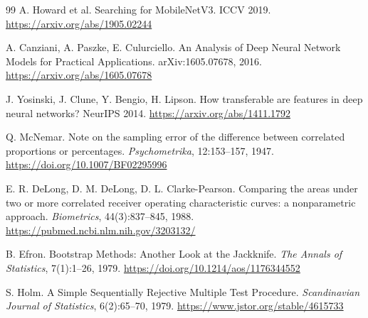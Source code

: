 \documentclass[11pt,a4paper]{article}
\begin{document}
\begin{thebibliography}{99}
A. Howard et al.
\newblock Searching for MobileNetV3.
\newblock ICCV 2019.
\newblock \url{https://arxiv.org/abs/1905.02244}

A. Canziani, A. Paszke, E. Culurciello.
\newblock An Analysis of Deep Neural Network Models for Practical Applications.
\newblock arXiv:1605.07678, 2016.
\newblock \url{https://arxiv.org/abs/1605.07678}

J. Yosinski, J. Clune, Y. Bengio, H. Lipson.
\newblock How transferable are features in deep neural networks?
\newblock NeurIPS 2014.
\newblock \url{https://arxiv.org/abs/1411.1792}

Q. McNemar.
\newblock Note on the sampling error of the difference between correlated proportions or percentages.
\newblock \textit{Psychometrika}, 12:153--157, 1947.
\newblock \url{https://doi.org/10.1007/BF02295996}

E. R. DeLong, D. M. DeLong, D. L. Clarke-Pearson.
\newblock Comparing the areas under two or more correlated receiver operating characteristic curves: a nonparametric approach.
\newblock \textit{Biometrics}, 44(3):837--845, 1988.
\newblock \url{https://pubmed.ncbi.nlm.nih.gov/3203132/}

B. Efron.
\newblock Bootstrap Methods: Another Look at the Jackknife.
\newblock \textit{The Annals of Statistics}, 7(1):1--26, 1979.
\newblock \url{https://doi.org/10.1214/aos/1176344552}

S. Holm.
\newblock A Simple Sequentially Rejective Multiple Test Procedure.
\newblock \textit{Scandinavian Journal of Statistics}, 6(2):65--70, 1979.
\newblock \url{https://www.jstor.org/stable/4615733}

\end{thebibliography}
\end{document}

